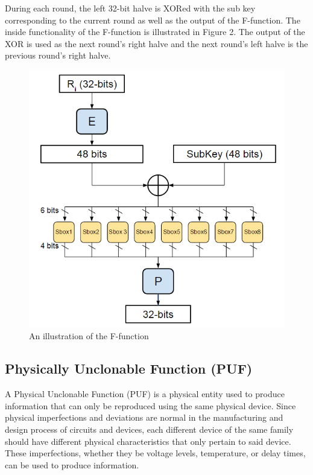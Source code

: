 \documentclass[letterpaper, 10 pt, conference]{ieeeconf}  %
\begin{document}
During each round, the left 32-bit halve is XORed with the sub key corresponding to the current round as well as the output of the F-function.  The inside functionality of the F-function is illustrated in Figure 2. The output of the XOR is used as the next round's right halve and the next round's left halve is the previous round's right halve.

\begin{figure}[thpb]
	\centering
	\includegraphics[scale=.50]{Ffunction}
    \caption{An illustration of the F-function}
\end{figure}


\subsection{Physically Unclonable Function (PUF)}

A Physical Unclonable Function (PUF) is a physical entity used to produce information that can only be reproduced using the same physical device.  Since physical imperfections and deviations are normal in the manufacturing and design process of circuits and devices, each different device of the same family should have different physical characteristics that only pertain to said device.  These imperfections, whether they be voltage levels, temperature, or delay times, can be used to produce information.
\end{document}
